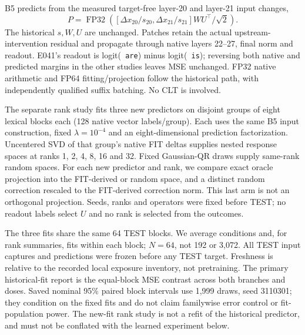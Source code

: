 B5 predicts from the measured target-free layer-20 and layer-21 input changes,
\[
 P=\operatorname{FP32}\!\left([\Delta x_{20}/s_{20},\Delta x_{21}/s_{21}]W U^\top/\sqrt2\right).
\]
The historical $s,W,U$ are unchanged. Patches retain the actual upstream-intervention residual and propagate through native layers 22--27, final norm and readout. E041's readout is logit(\texttt{ are}) minus logit(\texttt{ is}); reversing both native and predicted margins in the other studies leaves MSE unchanged. FP32 native arithmetic and FP64 fitting/projection follow the historical path, with independently qualified suffix batching. No CLT is involved.

The separate rank study fits three new predictors on disjoint groups of eight lexical blocks each (128 native vector labels/group). Each uses the same B5 input construction, fixed $\lambda=10^{-4}$ and an eight-dimensional prediction factorization. Uncentered SVD of that group's native FIT deltas supplies nested response spaces at ranks 1, 2, 4, 8, 16 and 32. Fixed Gaussian-QR draws supply same-rank random spaces. For each new predictor and rank, we compare exact oracle projection into the FIT-derived or random space, and a distinct random correction rescaled to the FIT-derived correction norm. This last arm is not an orthogonal projection. Seeds, ranks and operators were fixed before TEST; no readout labels select $U$ and no rank is selected from the outcomes.

The three fits share the same 64 TEST blocks. We average conditions and, for rank summaries, fits within each block; $N=64$, not 192 or 3,072. All TEST input captures and predictions were frozen before any TEST target. Freshness is relative to the recorded local exposure inventory, not pretraining. The primary historical-fit report is the equal-block MSE contrast across both branches and doses. Saved nominal 95\% paired block intervals use 1,999 draws, seed 3110301; they condition on the fixed fits and do not claim familywise error control or fit-population power. The new-fit rank study is not a refit of the historical predictor, and must not be conflated with the learned experiment below.

